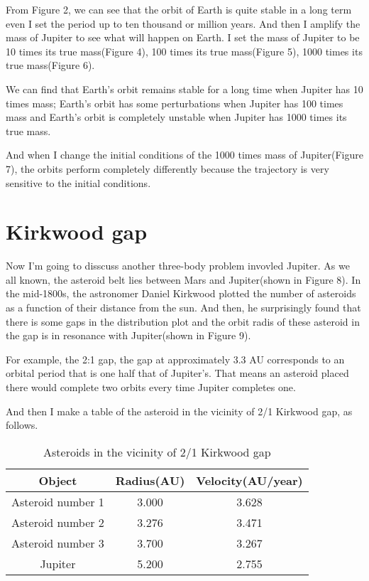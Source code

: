 \documentclass{article}
\begin{document}
From Figure 2, we can see that the orbit of Earth is quite stable in a long term even I set the period up to ten thousand or million years. And then I amplify the mass of Jupiter to see what will happen on Earth. I set the mass of Jupiter  to be 10 times its true mass(Figure 4), 100 times its true mass(Figure 5), 1000 times its true mass(Figure 6). 

We can find that Earth's orbit remains stable for a long time when Jupiter has 10 times mass; Earth's orbit has some perturbations when Jupiter has 100 times mass and Earth's orbit is completely unstable when Jupiter has 1000 times its true mass.

And when I change the initial conditions of the 1000 times mass of Jupiter(Figure 7), the orbits perform completely differently because the trajectory is very sensitive to the initial conditions.

\section*{Kirkwood gap}
Now I'm going to disscuss another three-body problem invovled Jupiter. As we all known, the asteroid belt lies between Mars and Jupiter(shown in Figure 8). In the mid-1800s, the astronomer Daniel Kirkwood plotted the number of asteroids as a function of their distance from the sun. And then, he surprisingly found that there is some gaps in the distribution plot and the orbit radis of these asteroid in the gap is in resonance with Jupiter(shown in Figure 9).

For example, the 2:1 gap, the gap at approximately 3.3 AU corresponds to an orbital period that is one half that of Jupiter's. That means an asteroid placed there would complete two orbits every time Jupiter completes one.

And then I make a table of the asteroid in the vicinity of 2/1 Kirkwood gap, as follows.
\begin{table}[h!]
\centering
\begin{tabular}{ ||c|c|c|| } 
 \hline
 Object & Radius(AU) & Velocity(AU/year) \\ 
 \hline
 \hline
 Asteroid number 1 & 3.000 & 3.628\\ 
 Asteroid number 2 & 3.276 & 3.471\\
 Asteroid number 3 & 3.700 & 3.267\\
 Jupiter & 5.200 & 2.755\\
 \hline
 \end{tabular}
\caption{Asteroids in the vicinity of 2/1 Kirkwood gap}
 \end{table}
\end{document}
